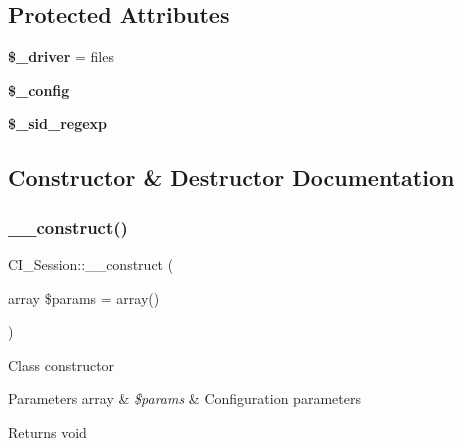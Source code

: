 \subsection*{Protected Attributes}
\begin{DoxyCompactItemize}
\item 
\mbox{\label{class_c_i___session_a2139b1eea8b07cc75505273133005ba2}} 
{\bfseries \$\+\_\+driver} = \textquotesingle{}files\textquotesingle{}
\item 
\mbox{\label{class_c_i___session_a380f7629a6c74678eafcf20320b36b00}} 
{\bfseries \$\+\_\+config}
\item 
\mbox{\label{class_c_i___session_aa9baf9c99e38b7b5879b4304f931b4dd}} 
{\bfseries \$\+\_\+sid\+\_\+regexp}
\end{DoxyCompactItemize}


\subsection{Constructor \& Destructor Documentation}
\mbox{\label{class_c_i___session_a25ed097b8862ede401887a389b1f0b37}} 
\subsubsection{\texorpdfstring{\+\_\+\+\_\+construct()}{\_\_construct()}}
{\footnotesize\ttfamily C\+I\+\_\+\+Session\+::\+\_\+\+\_\+construct (\begin{DoxyParamCaption}\item[{array}]{\$params = {\ttfamily array()} }\end{DoxyParamCaption})}

Class constructor


\begin{DoxyParams}[1]{Parameters}
array & {\em \$params} & Configuration parameters \\
\hline
\end{DoxyParams}
\begin{DoxyReturn}{Returns}
void 
\end{DoxyReturn}


